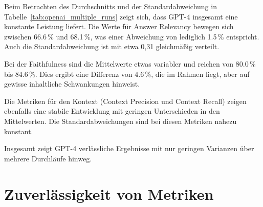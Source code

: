 \begin{table}[h!]
    \centering
    \caption[OpenAI Abweichungen mehrere Durchläufe]{Durchschnittswerte und Standardabweichungen der Metriken über vier Durchläufe für GPT-4}
    \label{tab:openai_multiple_runs}
\end{table}

Beim Betrachten des Durchschnitts und der Standardabweichung in Tabelle~\ref{tab:openai_multiple_runs} zeigt sich, dass GPT-4 insgesamt eine konstante Leistung liefert. Die Werte für Answer Relevancy bewegen sich zwischen 66.6\,\% und 68.1\,\%, was einer Abweichung von lediglich 1.5\,\% entspricht. Auch die Standardabweichung ist mit etwa 0{,}31 gleichmäßig verteilt.

Bei der Faithfulness sind die Mittelwerte etwas variabler und reichen von 80.0\,\% bis 84.6\,\%. Dies ergibt eine Differenz von 4.6\,\%, die im Rahmen liegt, aber auf gewisse inhaltliche Schwankungen hinweist.

Die Metriken für den Kontext (Context Precision und Context Recall) zeigen ebenfalls eine stabile Entwicklung mit geringen Unterschieden in den Mittelwerten. Die Standardabweichungen sind bei diesen Metriken nahezu konstant.

Insgesamt zeigt GPT-4 verlässliche Ergebnisse mit nur geringen Varianzen über mehrere Durchläufe hinweg. 


\section{Zuverlässigkeit von Metriken}\label{subsec:zuverlassigkeit-von-metriken}

